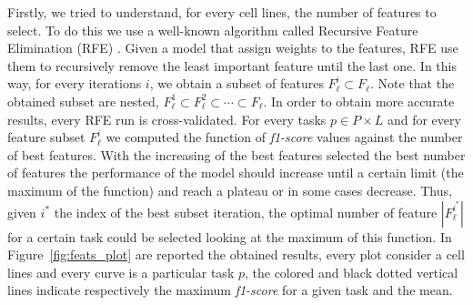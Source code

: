 Firstly, we tried to understand, for every cell lines, the number of features to select. To do this we use a well-known algorithm called Recursive Feature Elimination (RFE) \cite{VapnikRFE}. Given a model that assign weights to the features, RFE use them to recursively remove the least important feature until the last one. In this way, for every iterations $i$, we obtain a subset of features $F_{\ell}^{i} \subset F_\ell$. Note that the obtained subset are nested, $F_{\ell}^{1}  \subset  F_{\ell}^{2} \subset \cdots \subset F_{\ell}$. In order to obtain more accurate results, every RFE run is cross-validated. For every tasks $p \in P \times L$ and for every feature subset $F_\ell^i$ we computed the function of \emph{f1-score} values against the number of best features. With the increasing of the best features selected the best number of features the performance of the model should increase until a certain limit (the maximum of the function) and reach a plateau or in some cases decrease. Thus, given $i^{*}$ the index of the best subset iteration, the optimal number of feature $|F_\ell^{i^{*}}|$ for a certain task could be selected looking at the maximum of this function. In Figure~\ref{fig:feats_plot} are reported the obtained results, every plot consider a cell lines and every curve is a particular task $p$, the colored and black dotted vertical lines indicate respectively the maximum \emph{f1-score} for a given task and the mean. 

